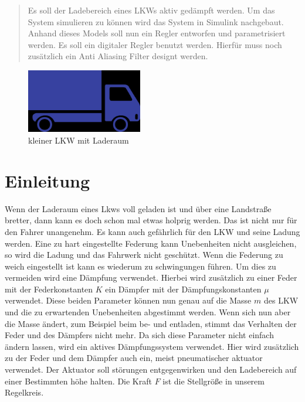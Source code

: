 	
	\begin{abstract} %
		Es soll der Ladebereich eines LKWs aktiv gedämpft werden. Um das System simulieren zu können wird das System in Simulink nachgebaut. Anhand dieses Models soll nun 
		ein Regler entworfen und parametrisiert werden. Es soll ein digitaler Regler benutzt werden. 
		Hierfür muss noch zusätzlich ein Anti Aliasing Filter designt werden.
	\end{abstract}

	\begin{figure}[h] 
		\centering
		   \includegraphics[width=0.45\textwidth]{Bilder/truckIcon.jpg}
		\caption{kleiner LKW mit Laderaum}
		\label{SimulinkStreckenModell}
	\end{figure}
	
	\section{Einleitung}
	Wenn der Laderaum eines Lkws voll geladen ist und über eine Landstraße bretter, dann kann es doch schon mal etwas holprig werden. Das ist nicht nur für den Fahrer unangenehm. Es kann auch gefährlich für den LKW und seine Ladung werden.
	Eine zu hart eingestellte Federung kann Unebenheiten nicht ausgleichen, so wird die Ladung und das Fahrwerk nicht geschützt. Wenn die Federung zu weich eingestellt ist kann es 
	wiederum zu schwingungen führen. Um dies zu vermeiden wird eine Dämpfung verwendet. Hierbei wird zusätzlich zu einer Feder mit der Federkonstanten $K$ ein Dämpfer mit der Dämpfungskonstanten $\mu$ verwendet. 
	Diese beiden Parameter können nun genau auf die Masse $m$ des LKW und die zu erwartenden Unebenheiten abgestimmt werden. 
	Wenn sich nun aber die Masse ändert, zum Beispiel beim be- und entladen, stimmt das Verhalten der Feder und des Dämpfers nicht mehr.
	Da sich diese Parameter nicht einfach ändern lassen, wird ein aktives Dämpfungssystem verwendet. Hier wird zusätzlich zu der Feder und dem Dämpfer 
	auch ein, meist pneumatischer aktuator verwendet. Der Aktuator soll störungen entgegenwirken und den Ladebereich auf einer Bestimmten höhe halten.
	Die Kraft $F$ ist die Stellgröße in unserem Regelkreis.
		
